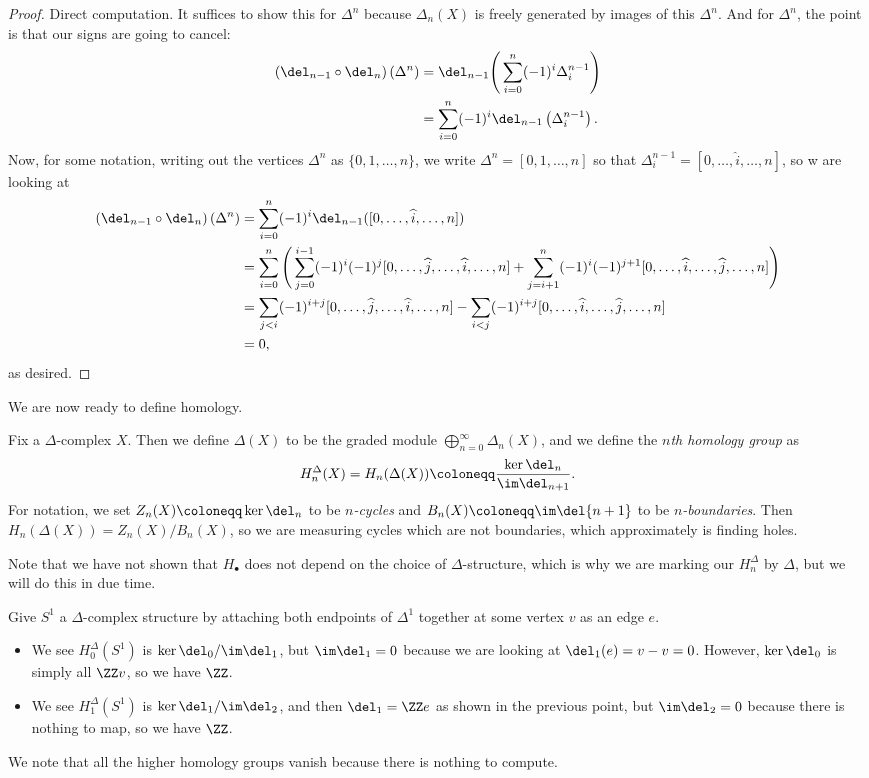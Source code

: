 \documentclass[../notes.tex]{subfiles}
\begin{document}
\begin{proof}
	Direct computation. It suffices to show this for $\Delta^n$ because $\Delta_n(X)$ is freely generated by images of this $\Delta^n$. And for $\Delta^n$, the point is that our signs are going to cancel:
	\begin{align*}
		(\del_{n-1}\circ\del_n)\left(\Delta^n\right) &= \del_{n-1}\Bigg(\sum_{i=0}^n(-1)^i\Delta^{n-1}_i\Bigg) \\
		&= \sum_{i=0}^{n}(-1)^i\del_{n-1}\left(\Delta^{n-1}_i\right).
	\end{align*}
	Now, for some notation, writing out the vertices $\Delta^n$ as $\{0,1,\ldots,n\}$, we write $\Delta^n=[0,1,\ldots,n]$ so that $\Delta^{n-1}_i=[0,\ldots,\widehat i,\ldots,n]$, so w are looking at
	\begin{align*}
		(\del_{n-1}\circ\del_n)\left(\Delta^n\right) &= \sum_{i=0}^{n}(-1)^i\del_{n-1}([0,\ldots,\widehat i,\ldots,n]) \\
		&= \sum_{i=0}^{n}\Bigg(\sum_{j=0}^{i-1}(-1)^i(-1)^j[0,\ldots,\widehat j,\ldots,\widehat i,\ldots,n]+\sum_{j=i+1}^{n}(-1)^i(-1)^{j+1}[0,\ldots,\widehat i,\ldots,\widehat j,\ldots,n]\Bigg) \\
		&= \sum_{j<i}(-1)^{i+j}[0,\ldots,\widehat j,\ldots,\widehat i,\ldots,n]-\sum_{i<j}(-1)^{i+j}[0,\ldots,\widehat i,\ldots,\widehat j,\ldots,n] \\
		&= 0,
	\end{align*}
	as desired.
\end{proof}
We are now ready to define homology.
\begin{definition}
	Fix a $\Delta$-complex $X$. Then we define $\Delta(X)$ to be the graded module $\bigoplus_{n=0}^\infty\Delta_n(X)$, and we define the \textit{$n$th homology group} as
	\[H_n^\Delta(X)=H_n(\Delta(X))\coloneqq\frac{\ker\del_n}{\im\del_{n+1}}.\]
	For notation, we set $Z_n(X)\coloneqq\ker\del_n$ to be \textit{$n$-cycles} and $B_n(X)\coloneqq\im\del{n+1}$ to be \textit{$n$-boundaries}. Then $H_n(\Delta(X))=Z_n(X)/B_n(X)$, so we are measuring cycles which are not boundaries, which approximately is finding holes.
\end{definition}
Note that we have not shown that $H_\bullet$ does not depend on the choice of $\Delta$-structure, which is why we are marking our $H_n^\Delta$ by $\Delta$, but we will do this in due time.
\begin{example}
	Give $S^1$ a $\Delta$-complex structure by attaching both endpoints of $\Delta^1$ together at some vertex $v$ as an edge $e$.
	\begin{itemize}
		\item We see $H_0^\Delta\left(S^1\right)$ is $\ker\del_0/\im\del_1$, but $\im\del_1=0$ because we are looking at $\del_1(e)=v-v=0$. However, $\ker\del_0$ is simply all $\ZZ v$, so we have $\ZZ$.
		\item We see $H_1^\Delta\left(S^1\right)$ is $\ker\del_1/\im\del_2$, and then $\del_1=\ZZ e$ as shown in the previous point, but $\im\del_2=0$ because there is nothing to map, so we have $\ZZ$.
	\end{itemize}
	We note that all the higher homology groups vanish because there is nothing to compute.
\end{example}
\end{document}
